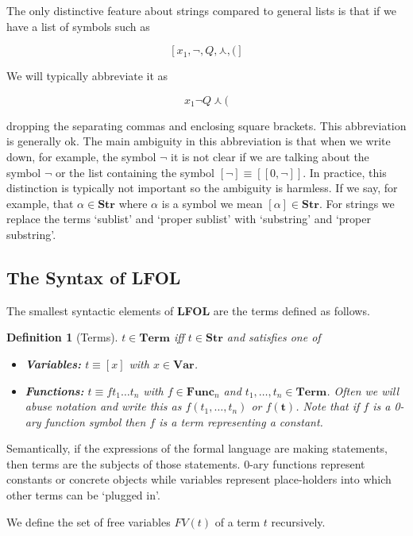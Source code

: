 \documentclass[12pt]{article}
\theoremstyle{break}
\newtheorem{definition}{Definition}[section]
\theoremstyle{break}
\theoremstyle{break}
\theoremstyle{break}
\newcommand{\bv}[1]{\boldsymbol{#1}}
\begin{document}
The only distinctive feature about strings compared to general lists is that if we have a list of symbols such as 

$$
[x_1, \lnot, Q, \curlywedge, (]
$$

We will typically abbreviate it as

$$
x_1\lnot Q\curlywedge (
$$

dropping the separating commas and enclosing square brackets.
This abbreviation is generally ok.
The main ambiguity in this abbreviation is that when we write down, for example, the symbol $\lnot$ it is not clear if we are talking about the symbol $\lnot$ or the list containing the symbol $[\lnot] \equiv [[0, \lnot]]$.
In practice, this distinction is typically not important so the ambiguity is harmless.
If we say, for example, that $\alpha \in \textbf{Str}$ where $\alpha$ is a symbol we mean $[\alpha] \in \textbf{Str}$.
For strings we replace the terms `sublist' and `proper sublist' with `substring' and `proper substring'.


\subsection{The Syntax of LFOL}

The smallest syntactic elements of \textbf{LFOL} are the terms defined as follows.

\begin{definition}[Terms]

$t \in \textbf{Term}$ iff $t \in \textbf{Str}$ and satisfies one of
\begin{itemize}
\item{\textbf{Variables:} $t\equiv [x]$ with $x \in \textbf{Var}$.}
\item{\textbf{Functions:} $t \equiv ft_1 \ldots t_n$ with $f \in \textbf{Func}_n$ and $t_1, \ldots, t_n \in \textbf{Term}$. Often we will abuse notation and write this as $f(t_1, \ldots, t_n)$ or $f(\bv{t})$. Note that if $f$ is a 0-ary function symbol then $f$ is a term representing a constant.}
\end{itemize}
\end{definition}

Semantically, if the expressions of the formal language are making statements, then terms are the subjects of those statements.
0-ary functions represent constants or concrete objects while variables represent place-holders into which other terms can be `plugged in'.

We define the set of free variables $FV(t)$ of a term $t$ recursively.
\end{document}
